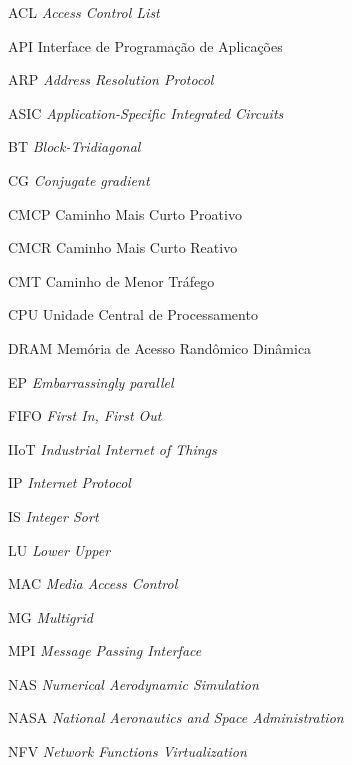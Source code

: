 
\listoffigures*
\cleardoublepage



\listoftables*
\cleardoublepage

\begin{siglas}
    
    \item[ACL] \textit{Access Control List}
	\item[API] Interface de Programação de Aplicações
	\item[ARP] \textit{Address Resolution Protocol}
	\item[ASIC] \textit{Application-Specific Integrated Circuits}
	\item[BT]{\textit{Block-Tridiagonal}}
	\item[CG]{\textit{Conjugate gradient}}
	\item[CMCP]{Caminho Mais Curto Proativo}
	\item[CMCR]{Caminho Mais Curto Reativo}
	\item[CMT]{Caminho de Menor Tráfego}
	\item[CPU]{Unidade Central de Processamento}
	\item[DRAM]{Memória de Acesso Randômico Dinâmica}
	\item[EP]{\textit{Embarrassingly parallel}}
	\item[FIFO]{ \textit{First In, First Out}}
	\item[IIoT]{\textit{Industrial Internet of Things}}
	\item[IP]{\textit{Internet Protocol}}
	\item[IS]{\textit{Integer Sort}}
	\item[LU]{\textit{Lower Upper}}
	\item[MAC]{\textit{Media Access Control}}
	\item[MG]{\textit{Multigrid}}
	\item[MPI]{\textit{Message Passing Interface}}
	\item[NAS]{\textit{Numerical Aerodynamic Simulation}}
	\item[NASA]{\textit{National Aeronautics and Space Administration}}
	\item[NFV]{\textit{Network Functions Virtualization}}

\end{siglas}
